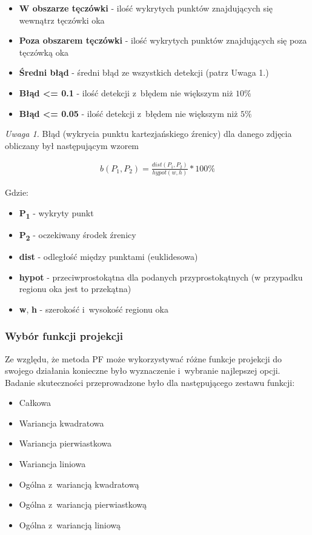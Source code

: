 \begin{itemize}
    \item \textbf{W obszarze tęczówki} - ilość wykrytych punktów znajdujących się wewnątrz tęczówki oka
    \item \textbf{Poza obszarem tęczówki} - ilość wykrytych punktów znajdujących się poza tęczówką oka
    \item \textbf{Średni błąd} - średni błąd ze wszystkich detekcji (patrz Uwaga 1.)
    \item \textbf{Błąd <= 0.1} - ilość detekcji z~błędem nie większym niż $10\%$
    \item \textbf{Błąd <= 0.05} - ilość detekcji z~błędem nie większym niż $5\%$
\end{itemize}

\par

\textit{Uwaga 1.} Błąd (wykrycia punktu kartezjańskiego źrenicy) dla danego zdjęcia obliczany był następującym wzorem

\begin{align}
    b(P_1, P_2) = \frac{dist(P_1, P_2)}{hypot(w, h)} * 100\%
\end{align}

Gdzie:

\begin{itemize}
    \item \textbf{P\textsubscript{1}} - wykryty punkt
    \item \textbf{P\textsubscript{2}} - oczekiwany środek źrenicy
    \item \textbf{dist} - odległość między punktami (euklidesowa)
    \item \textbf{hypot} - przeciwprostokątna dla podanych przyprostokątnych (w przypadku regionu oka jest to przekątna)
    \item \textbf{w}, \textbf{h} - szerokość i~wysokość regionu oka
\end{itemize}



\subsubsection{Wybór funkcji projekcji}

Ze względu, że metoda PF może wykorzystywać różne funkcje projekcji do swojego działania konieczne było wyznaczenie i~wybranie najlepszej opcji. Badanie skuteczności przeprowadzone było dla następującego zestawu funkcji:

\begin{itemize}
    \item Całkowa
    \item Wariancja kwadratowa
    \item Wariancja pierwiastkowa
    \item Wariancja liniowa
    \item Ogólna z~wariancją kwadratową
    \item Ogólna z~wariancją pierwiastkową
    \item Ogólna z~wariancją liniową
\end{itemize}

